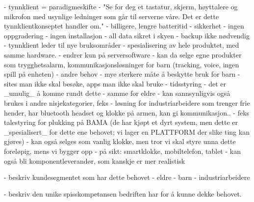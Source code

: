   - tynnklient = paradigmeskifte
    - "Se for deg et tastatur, skjerm, høyttalere og mikrofon med
    usynlige ledninger som går til serverne våre. Det er dette
    tynnklientkonseptet handler om."
  - billigere, lengre batteritid
  - sikkerhet
    - ingen oppgradering
    - ingen installasjon
    - all data sikret i skyen
    - backup ikke nødvendig
  - tynnklient leder til nye bruksområder
    - spesialisering av hele produktet, med samme hardware.
      - endrer kun på serversoftware
      - kan da selge egne produkter som trygghetsalarm, kommunikasjonsløsninger
      for barn (tracking, voice, ingen spill på enheten)
  - andre behov
    - mye sterkere måte å beskytte bruk for barn
      - sites man ikke skal besøke, apps man ikke skal bruke
      - tidsstyring
      - det er _umulig_ å komme rundt dette
    - samme for eldre
    - kan sannsynligvis også brukes i andre nisjekategorier, feks
      - løsning for industriarbeidere som trenger frie hender, har bluetooth
      headset og klokke på armen, kan gi kommunikasjon..
      - feks talestyring for plukking på BAMA (de har kjøpt et dyrt system, men
          dette er _spesialisert_ for dette ene behovet; vi lager en PLATTFORM
          der slike ting kan gjøres)
    - kan også selges som vanlig klokke, men tror vi skal styre unna dette
    foreløpig, mens vi bygger opp
    - på sikt: smartklokke, mobiltelefon, tablet
    - kan også bli komponentleverandør, som kanskje er mer realistisk

- beskriv kundesegmentet som har dette behovet
  - eldre
  - barn
  - industriarbeidere

- beskriv den unike spisskompetansen bedriften har for å kunne dekke behovet.


